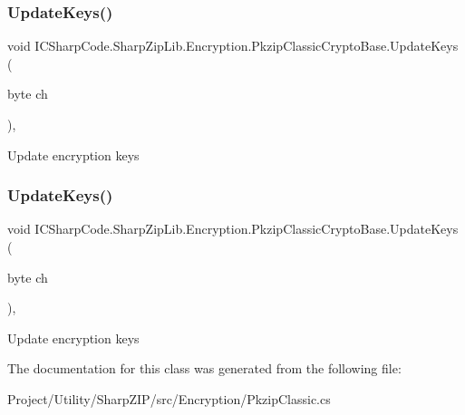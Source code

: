 \subsubsection{\texorpdfstring{Update\+Keys()}{UpdateKeys()}\hspace{0.1cm}{\footnotesize\ttfamily [1/2]}}
{\footnotesize\ttfamily void I\+C\+Sharp\+Code.\+Sharp\+Zip\+Lib.\+Encryption.\+Pkzip\+Classic\+Crypto\+Base.\+Update\+Keys (\begin{DoxyParamCaption}\item[{byte}]{ch }\end{DoxyParamCaption})\hspace{0.3cm}{\ttfamily [inline]}, {\ttfamily [protected]}}



Update encryption keys 

\mbox{\label{class_i_c_sharp_code_1_1_sharp_zip_lib_1_1_encryption_1_1_pkzip_classic_crypto_base_a7ee277def4a9c274b50619991fd4aa34}} 
\subsubsection{\texorpdfstring{Update\+Keys()}{UpdateKeys()}\hspace{0.1cm}{\footnotesize\ttfamily [2/2]}}
{\footnotesize\ttfamily void I\+C\+Sharp\+Code.\+Sharp\+Zip\+Lib.\+Encryption.\+Pkzip\+Classic\+Crypto\+Base.\+Update\+Keys (\begin{DoxyParamCaption}\item[{byte}]{ch }\end{DoxyParamCaption})\hspace{0.3cm}{\ttfamily [inline]}, {\ttfamily [protected]}}



Update encryption keys 



The documentation for this class was generated from the following file\+:\begin{DoxyCompactItemize}
\item 
Project/\+Utility/\+Sharp\+Z\+I\+P/src/\+Encryption/Pkzip\+Classic.\+cs\end{DoxyCompactItemize}

